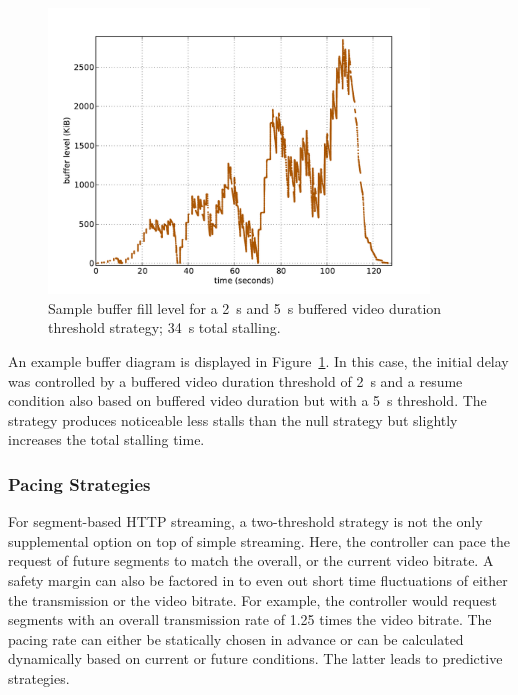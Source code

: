 \begin{figure}[htb]
    \centering
    \includegraphics[width=0.9\textwidth]{images/bufferlevel-flash-new.pdf}
    \caption{Sample buffer fill level for a \SI{2}{\second} and \SI{5}{\second} buffered video duration threshold strategy; \SI{34}{\second} total stalling.}
    \label{c3:fig:bufferlevel-flash}
\end{figure}

An example buffer diagram is displayed in Figure~\ref{c3:fig:bufferlevel-flash}. In this case, the initial delay was controlled by a buffered video duration threshold of \SI{2}{\second} and a resume condition also based on buffered video duration but with a \SI{5}{\second} threshold. The strategy produces noticeable less stalls than the null strategy but slightly increases the total stalling time.


\subsubsection{Pacing Strategies}

For segment-based \gls{HTTP} streaming, a two-threshold strategy is not the only supplemental option on top of simple streaming. Here, the controller can pace the request of future segments to match the overall, or the current video bitrate. A safety margin can also be factored in to even out short time fluctuations of either the transmission or the video bitrate. For example, the controller would request segments with an overall transmission rate of 1.25 times the video bitrate. The pacing rate can either be statically chosen in advance or can be calculated dynamically based on current or future conditions. The latter leads to predictive strategies.

